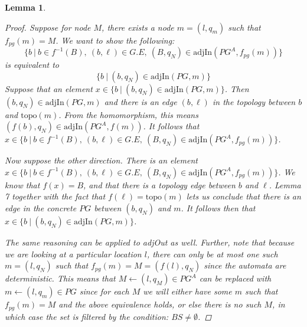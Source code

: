 \documentclass[twocolumn, openany]{sig-alternate-10pt}
\newcommand{\Topo}{\ensuremath{\mathrm{topo}}}
\newtheorem{lem}[thm]{Lemma}
\begin{document}
\begin{lem}
\begin{proof}
    Suppose for node $M$, there exists a node $m=(l,q_m)$ such that $f_{pg}(m) = M$. 
    We want to show the following:
    $$\{b ~\vert~ b \in f^{-1}(B),~ (b,\ell) \in G.E,~ (B,q_N) \in \mathrm{adjIn}(PG^A,f_{pg}(m)) \}$$
    is equivalent to
    $$\{ b ~\vert~ (b,q_N) \in \mathrm{adjIn}(PG,m)\}$$
    Suppose that an element $x \in \{ b ~\vert~ (b,q_N) \in \mathrm{adjIn}(PG,m)\}$. Then $(b,q_N) \in \mathrm{adjIn}(PG,m)$ and there is an edge $(b,\ell)$ in the topology between $b$ and $\Topo(m)$. From the homomorphism, this means $(f(b),q_N) \in \mathrm{adjIn}(PG^A,f(m))$. It follows that $x \in \{b ~\vert~ b \in f^{-1}(B),~ (b,\ell) \in G.E,~ (B,q_N) \in \mathrm{adjIn}(PG^A,f_{pg}(m)) \}$. 

    \vspace{1em}
    \noindent
    Now suppose the other direction. There is an element $x \in \{b ~\vert~ b \in f^{-1}(B),~ (b,\ell) \in G.E,~ (B,q_N) \in \mathrm{adjIn}(PG^A,f_{pg}(m)) \}$. We know that $f(x) = B$, and that there is a topology edge between $b$ and $\ell$. Lemma 7 together with the fact that $f(\ell) = \Topo(m)$ lets us conclude that there is an edge in the concrete $PG$ between $(b,q_N)$ and $m$. It follows then that $x \in \{ b ~\vert~ (b,q_N) \in \mathrm{adjIn}(PG,m)\}$.

    \vspace{1em}
    \noindent
    The same reasoning can be applied to adjOut as well. Further, note that because we are looking at a particular location $l$, there can only be at most one such $m = (l,q_N)$ such that $f_{pg}(m) = M = (f(l), q_N)$ since the automata are deterministic. 
    This means that $M \leftarrow (l,q_M) \in PG^A$ can be replaced with $m \leftarrow (l,q_m) \in PG$ since for each $M$ we will either have some $m$ such that $f_{pg}(m) = M$ and the above equivalence holds, or else there is no such $M$, in which case the set is filtered by the condition: $BS \neq \emptyset$.

  \end{proof}


\end{lem}
\end{document}
